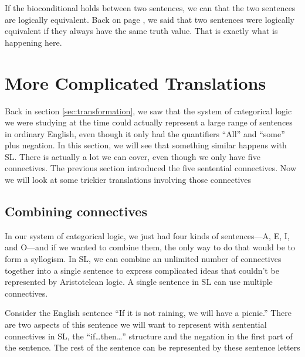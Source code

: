 If the bioconditional holds between two sentences, we can that the two sentences are logically equivalent. Back on page \pageref{def:logical_equivalence}, we said that two sentences were logically equivalent if they always  have the same truth value. That is exactly what is happening here. 



\section{More Complicated Translations}

{Back in section \ref{sec:transformation}, we saw that the system of categorical logic we were studying at the time could actually represent a large range of sentences in ordinary English, even though it only had the quantifiers ``All'' and ``some'' plus negation. In this section, we will see that something similar happens with SL. There is actually a lot we can cover, even though we only have five connectives. }%
{The previous section introduced the five sentential connectives. Now we will look at some trickier translations involving those connectives}%


\subsection{Combining connectives}

{In our system of categorical logic, we just had four kinds of sentences---A, E, I, and O---and if we wanted to combine them, the only way to do that would be to form a syllogism. In SL, we can combine an unlimited number of connectives together into a single sentence to express complicated ideas that couldn't be represented by Aristotelean logic. }%
{A single sentence in SL can use multiple connectives.} %

Consider the English sentence ``If it is not raining, we will have a picnic.'' There are two aspects of this sentence we will want to represent with sentential connectives in SL, the ``if\ldots then\ldots'' structure and the negation in the first part of the sentence. The rest of the sentence can be represented by these sentence letters

